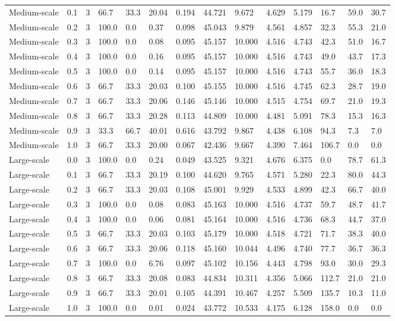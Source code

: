 \begin{longtable}{llrlllllllllll}
Medium-scale & 0.1 & 3 & 66.7 & 33.3 & 20.04 & 0.194 & 44.721 & 9.672 & 4.629 & 5.179 & 16.7 & 59.0 & 30.7 \\
Medium-scale & 0.2 & 3 & 100.0 & 0.0 & 0.37 & 0.098 & 45.043 & 9.879 & 4.561 & 4.857 & 32.3 & 55.3 & 21.0 \\
Medium-scale & 0.3 & 3 & 100.0 & 0.0 & 0.08 & 0.095 & 45.157 & 10.000 & 4.516 & 4.743 & 42.3 & 51.0 & 16.7 \\
Medium-scale & 0.4 & 3 & 100.0 & 0.0 & 0.16 & 0.095 & 45.157 & 10.000 & 4.516 & 4.743 & 49.0 & 43.7 & 17.3 \\
Medium-scale & 0.5 & 3 & 100.0 & 0.0 & 0.14 & 0.095 & 45.157 & 10.000 & 4.516 & 4.743 & 55.7 & 36.0 & 18.3 \\
Medium-scale & 0.6 & 3 & 66.7 & 33.3 & 20.03 & 0.100 & 45.155 & 10.000 & 4.516 & 4.745 & 62.3 & 28.7 & 19.0 \\
Medium-scale & 0.7 & 3 & 66.7 & 33.3 & 20.06 & 0.146 & 45.146 & 10.000 & 4.515 & 4.754 & 69.7 & 21.0 & 19.3 \\
Medium-scale & 0.8 & 3 & 66.7 & 33.3 & 20.28 & 0.113 & 44.809 & 10.000 & 4.481 & 5.091 & 78.3 & 15.3 & 16.3 \\
Medium-scale & 0.9 & 3 & 33.3 & 66.7 & 40.01 & 0.616 & 43.792 & 9.867 & 4.438 & 6.108 & 94.3 & 7.3 & 7.0 \\
Medium-scale & 1.0 & 3 & 66.7 & 33.3 & 20.00 & 0.067 & 42.436 & 9.667 & 4.390 & 7.464 & 106.7 & 0.0 & 0.0 \\
Large-scale & 0.0 & 3 & 100.0 & 0.0 & 0.24 & 0.049 & 43.525 & 9.321 & 4.676 & 6.375 & 0.0 & 78.7 & 61.3 \\
Large-scale & 0.1 & 3 & 66.7 & 33.3 & 20.19 & 0.100 & 44.620 & 9.765 & 4.571 & 5.280 & 22.3 & 80.0 & 44.3 \\
Large-scale & 0.2 & 3 & 66.7 & 33.3 & 20.03 & 0.108 & 45.001 & 9.929 & 4.533 & 4.899 & 42.3 & 66.7 & 40.0 \\
Large-scale & 0.3 & 3 & 100.0 & 0.0 & 0.08 & 0.083 & 45.163 & 10.000 & 4.516 & 4.737 & 59.7 & 48.7 & 41.7 \\
Large-scale & 0.4 & 3 & 100.0 & 0.0 & 0.06 & 0.081 & 45.164 & 10.000 & 4.516 & 4.736 & 68.3 & 44.7 & 37.0 \\
Large-scale & 0.5 & 3 & 66.7 & 33.3 & 20.03 & 0.103 & 45.179 & 10.000 & 4.518 & 4.721 & 71.7 & 38.3 & 40.0 \\
Large-scale & 0.6 & 3 & 66.7 & 33.3 & 20.06 & 0.118 & 45.160 & 10.044 & 4.496 & 4.740 & 77.7 & 36.7 & 36.3 \\
Large-scale & 0.7 & 3 & 100.0 & 0.0 & 6.76 & 0.097 & 45.102 & 10.156 & 4.443 & 4.798 & 93.0 & 30.0 & 29.3 \\
Large-scale & 0.8 & 3 & 66.7 & 33.3 & 20.08 & 0.083 & 44.834 & 10.311 & 4.356 & 5.066 & 112.7 & 21.0 & 21.0 \\
Large-scale & 0.9 & 3 & 66.7 & 33.3 & 20.01 & 0.105 & 44.391 & 10.467 & 4.257 & 5.509 & 135.7 & 10.3 & 11.0 \\
Large-scale & 1.0 & 3 & 100.0 & 0.0 & 0.01 & 0.024 & 43.772 & 10.533 & 4.175 & 6.128 & 158.0 & 0.0 & 0.0 \\
\end{longtable}
